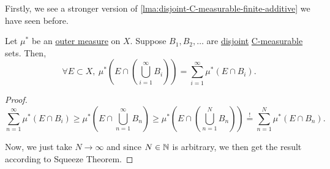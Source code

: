 Firstly, we see a stronger version of \autoref{lma:disjoint-C-measurable-finite-additive} we have seen before.
\begin{lemma}\label{lma:disjoint-C-measurable-infinite-additive}
	Let \(\mu^{*} \) be an \hyperref[def:outer-measure]{outer measure} on \(X\). Suppose \(B_1, B_2, \ldots\) are \underline{disjoint} \hyperref[def:C-measurable]{C-measurable} sets.
	Then,
	\[
		\forall E\subset X,\ \mu^{*} \left(E\cap \left(\bigcup\limits_{i=1}^{\infty} B_{i}\right)\right) = \sum\limits_{i=1}^{\infty} \mu^{*} \left(E\cap B_i\right).
	\]
\end{lemma}
\begin{proof}
	\[
		\sum\limits_{n=1}^{\infty} \mu^{*} (E\cap B_{i}) \geq \mu^{*} \left(E\cap \bigcup\limits_{n=1}^{\infty} B_{n}\right) \geq\mu^{*} \left(E\cap \left(\bigcup\limits_{n=1}^{N} B_{n}\right)\right) \overset{\hyperref[lma:disjoint-C-measurable-finite-additive]{!}}{=} \sum\limits_{n=1}^{N} \mu^{*} \left(E\cap B_n\right).
	\]

	Now, we just take \(N\to \infty \) and since \(N\in\mathbb{\MakeUppercase{N}} \) is arbitrary, we then get the result according to Squeeze Theorem.
\end{proof}

